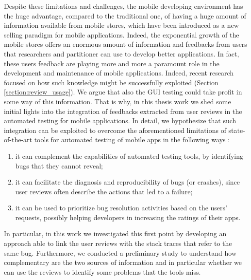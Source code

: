 Despite these limitations and challenges, the mobile developing environment has the huge advantage, compared to the traditional one, of having a huge amount of information available from mobile stores, which have been introduced as a new selling paradigm for mobile applications. Indeed, the exponential growth of the mobile stores offers an enormous amount of information and feedbacks from users that researchers and partitioner can use to develop better applications. In fact, these users feedback are playing more and more a paramount role in the development and maintenance of mobile applications. Indeed, recent research focused on how such knowledge might be successfully exploited (Section \ref{section:review_usage}). 
We argue that also the GUI testing could take profit in some way of this information. That is why, in this thesis work we shed some initial lights into the integration of feedbacks extracted from user reviews in the automated testing for mobile applications.
In detail, we hypothesize that such integration can be exploited to overcome the aforementioned limitations of state-of-the-art tools for automated testing of mobile apps in the following ways \cite{cristal}: 
\begin{enumerate}
\item it can complement the capabilities of automated testing tools, by identifying bugs that they cannot reveal; 
\item it can facilitate the diagnosis and reproducibility of bugs (or crashes), since user reviews often describe the actions that led to a failure; 
\item it can be used to prioritize bug resolution activities based on the users' requests, possibly helping developers in increasing the ratings of their apps.
\end{enumerate} 
In particular, in this work we investigated this first point by developing an approach able to link the user reviews with the stack traces that refer to the same bug. Furthermore, we conducted a preliminary study to understand how complementary are the two sources of information and in particular whether we can use the reviews to identify some problems that the tools miss. 

